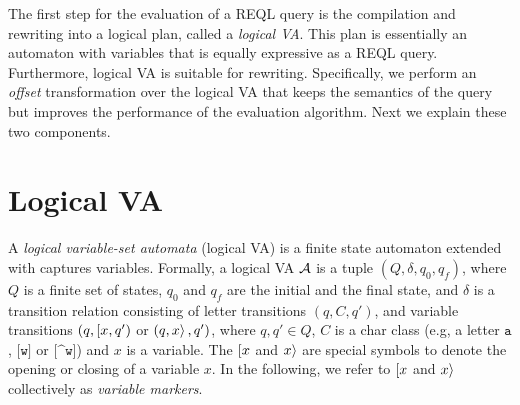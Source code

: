 %

The first step for the evaluation of a REQL query is the compilation and rewriting into a logical plan, called a \emph{logical VA}. This plan is essentially an automaton with variables that is equally expressive as a REQL query. Furthermore, logical VA is suitable for rewriting. Specifically, we perform an \emph{offset} transformation over the logical VA that keeps the semantics of the query but improves the performance of the evaluation algorithm. Next we explain these two components. %

\section{Logical VA}

A \emph{logical variable-set automata} (logical VA) is a finite state automaton extended with captures variables. %
Formally, a logical VA $\mathcal{A}$ is a tuple $(Q, \delta, q_0, q_f)$,
where $Q$ is a finite set of states, $q_0$ and $q_f$ are the initial and the final state, and $\delta$
is a transition relation consisting of letter transitions $(q, C, q')$, and variable transitions $(q, [ x, q')$ or $(q,
	x \rangle\,,q')$, where $q, q' \in Q$, $C$ is a char class (e.g, a letter $\texttt{a}$, $\texttt{[w]}$
or $\texttt{[\textasciicircum w]}$) and $x$ is a variable.
The $[ x$ and $x \rangle$ are special symbols to denote the opening or closing of a variable $x$. In the following, we refer to $[ x$ and $x \rangle$ collectively as
\emph{variable markers}. 

